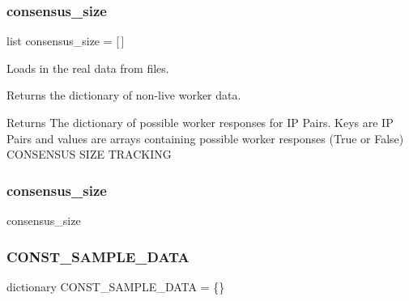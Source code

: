 \mbox{\label{classdynamicfilterapp_1_1test__simulations_1_1_simulation_test_a3524ef5465572a82fd0b944fe640b1ac}} 
\subsubsection{\texorpdfstring{consensus\_size}{consensus\_size}\hspace{0.1cm}{\footnotesize\ttfamily [1/2]}}
{\footnotesize\ttfamily list consensus\+\_\+size = \mbox{[}$\,$\mbox{]}\hspace{0.3cm}{\ttfamily [static]}}



Loads in the real data from files. 

Returns the dictionary of non-\/live worker data. \begin{DoxyReturn}{Returns}
The dictionary of possible worker responses for IP Pairs. Keys are IP Pairs and values are arrays containing possible worker responses (True or False) C\+O\+N\+S\+E\+N\+S\+US S\+I\+ZE T\+R\+A\+C\+K\+I\+NG 
\end{DoxyReturn}
\mbox{\label{classdynamicfilterapp_1_1test__simulations_1_1_simulation_test_a7ec40c4cf4f8c7845b4f1c2643cb15f0}} 
\subsubsection{\texorpdfstring{consensus\_size}{consensus\_size}\hspace{0.1cm}{\footnotesize\ttfamily [2/2]}}
{\footnotesize\ttfamily consensus\+\_\+size}

\mbox{\label{classdynamicfilterapp_1_1test__simulations_1_1_simulation_test_a1b3f4a822bf543618008e30d49dd9345}} 
\subsubsection{\texorpdfstring{CONST\_SAMPLE\_DATA}{CONST\_SAMPLE\_DATA}\hspace{0.1cm}{\footnotesize\ttfamily [1/2]}}
{\footnotesize\ttfamily dictionary C\+O\+N\+S\+T\+\_\+\+S\+A\+M\+P\+L\+E\+\_\+\+D\+A\+TA = \{\}\hspace{0.3cm}{\ttfamily [static]}}

